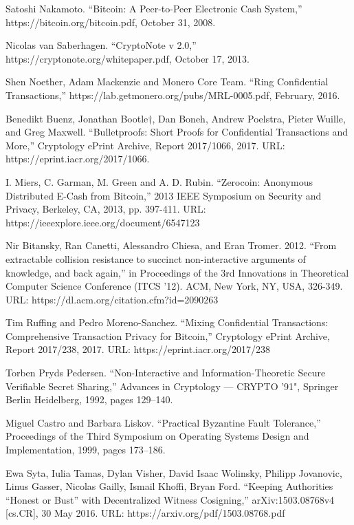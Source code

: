 \documentclass[8pt,fleqn,openany]{book}
\begin{document}
\newpage
\raggedright
% 
% 

\begin{thebibliography}{99}

 Satoshi Nakamoto. ``Bitcoin: A Peer-to-Peer Electronic Cash System,'' https://bitcoin.org/bitcoin.pdf, October 31, 2008.

 Nicolas van Saberhagen. ``CryptoNote v 2.0,'' https://cryptonote.org/whitepaper.pdf, October 17, 2013.

 Shen Noether, Adam Mackenzie and Monero Core Team. ``Ring Confidential Transactions,'' https://lab.getmonero.org/pubs/MRL-0005.pdf, February, 2016.

 Benedikt Buenz, Jonathan Bootle†, Dan Boneh, Andrew Poelstra, Pieter Wuille, and Greg Maxwell. ``Bulletproofs: Short Proofs for Confidential Transactions and More,'' Cryptology ePrint Archive, Report 2017/1066, 2017. URL: https://eprint.iacr.org/2017/1066.

 I. Miers, C. Garman, M. Green and A. D. Rubin. ``Zerocoin: Anonymous Distributed E-Cash from Bitcoin,'' 2013 IEEE Symposium on Security and Privacy, Berkeley, CA, 2013, pp. 397-411. URL: https://ieeexplore.ieee.org/document/6547123

 Nir Bitansky, Ran Canetti, Alessandro Chiesa, and Eran Tromer. 2012. ``From extractable collision resistance to succinct non-interactive arguments of knowledge, and back again,'' in Proceedings of the 3rd Innovations in Theoretical Computer Science Conference (ITCS '12). ACM, New York, NY, USA, 326-349. URL: https://dl.acm.org/citation.cfm?id=2090263

 Tim Ruffing and Pedro Moreno-Sanchez. ``Mixing Confidential Transactions: Comprehensive Transaction Privacy for Bitcoin,'' Cryptology ePrint Archive, Report 2017/238, 2017. URL: https://eprint.iacr.org/2017/238

 Torben Pryds Pedersen. ``Non-Interactive and Information-Theoretic Secure Verifiable Secret Sharing,'' Advances in Cryptology --- CRYPTO '91", Springer Berlin Heidelberg, 1992, pages 129--140.

 Miguel Castro and Barbara Liskov. ``Practical Byzantine Fault Tolerance,'' Proceedings of the Third Symposium on Operating Systems Design and Implementation, 1999, pages 173--186. 

 Ewa Syta, Iulia Tamas, Dylan Visher, David Isaac Wolinsky, Philipp Jovanovic, Linus Gasser, Nicolas Gailly, Ismail Khoffi, Bryan Ford. ``Keeping Authorities “Honest or Bust” with Decentralized Witness Cosigning,'' arXiv:1503.08768v4 [cs.CR], 30 May 2016. URL: https://arxiv.org/pdf/1503.08768.pdf


\end{thebibliography}
\end{document}
